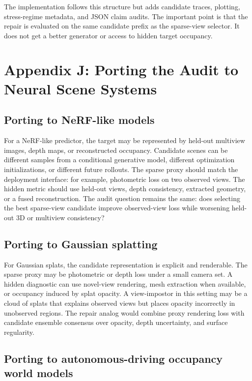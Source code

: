 \documentclass{article}
\begin{document}
The implementation follows this structure but adds candidate traces, plotting,
stress-regime metadata, and JSON claim audits. The important point is that the
repair is evaluated on the same candidate prefix as the sparse-view selector.
It does not get a better generator or access to hidden target occupancy.

\section{Appendix J: Porting the Audit to Neural Scene Systems}

\subsection{Porting to NeRF-like models}

For a NeRF-like predictor, the target may be represented by held-out multiview
images, depth maps, or reconstructed occupancy. Candidate scenes can be
different samples from a conditional generative model, different optimization
initializations, or different future rollouts. The sparse proxy should match
the deployment interface: for example, photometric loss on two observed views.
The hidden metric should use held-out views, depth consistency, extracted
geometry, or a fused reconstruction. The audit question remains the same:
does selecting the best sparse-view candidate improve observed-view loss while
worsening held-out 3D or multiview consistency?

\subsection{Porting to Gaussian splatting}

For Gaussian splats, the candidate representation is explicit and renderable.
The sparse proxy may be photometric or depth loss under a small camera set. A
hidden diagnostic can use novel-view rendering, mesh extraction when available,
or occupancy induced by splat opacity. A view-impostor in this setting may be a
cloud of splats that explains observed views but places opacity incorrectly in
unobserved regions. The repair analog would combine proxy rendering loss with
candidate ensemble consensus over opacity, depth uncertainty, and surface
regularity.

\subsection{Porting to autonomous-driving occupancy world models}
\end{document}
